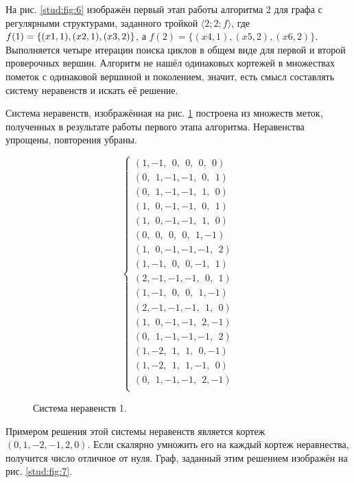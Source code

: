 \documentclass[14pt]{mmcs_article}
\begin{document}
На рис. \ref{stud:fig:6} изображён первый этап работы алгоритма 2 для графа с регулярными структурами, заданного тройкой $ \langle 2; 2; f\rangle $, где $ f(1) = \{ (x1, 1),\\ (x2, 1), (x3, 2) \} $, а $f(2) = \{ (x4, 1), (x5, 2), (x6, 2) \}$. Выполняется четыре итерации поиска циклов в общем виде для первой и второй проверочных вершин. Алгоритм не нашёл одинаковых кортежей в множествах пометок с одинаковой вершиной и поколением, значит, есть смысл составлять систему неравенств и искать её решение.

Система неравенств, изображённая на рис. \ref{stud:eqs:1} построена из множеств меток, полученных в результате работы первого этапа алгоритма. Неравенства упрощены, повторения убраны.

\begin{figure}[H]
  \centering
  \[
    \left\{
      \begin{array}{ll}
        (1,-1,\ \ 0,\ \ 0,\ \ 0,\ \ 0)\\
        (0,\ \ 1,-1,-1,\ \ 0,\ \ 1)\\
        (0,\ \ 1,-1,-1,\ \ 1,\ \ 0)\\
        (1,\ \ 0,-1,-1,\ \ 0,\ \ 1)\\
        (1,\ \ 0,-1,-1,\ \ 1,\ \ 0)\\
        (0,\ \ 0,\ \ 0,\ \ 0,\ \ 1,-1)\\
        (1,\ \ 0,-1,-1,-1,\ \ 2)\\
        (1,-1,\ \ 0,\ \ 0,-1,\ \ 1)\\
        (2,-1,-1,-1,\ \ 0,\ \ 1)\\
        (1,-1,\ \ 0,\ \ 0,\ \ 1,-1)\\
        (2,-1,-1,-1,\ \ 1,\ \ 0)\\
        (1,\ \ 0,-1,-1,\ \ 2,-1)\\
        (0,\ \ 1,-1,-1,-1,\ \ 2)\\
        (1,-2,\ \ 1,\ \ 1,\ \ 0,-1)\\
        (1,-2,\ \ 1,\ \ 1,-1,\ \ 0)\\
        (0,\ \ 1,-1,-1,\ \ 2,-1)\\
      \end{array}
    \right.
  \]
  \caption{ Система неравенств 1. }
  \label{stud:eqs:1}
\end{figure}

Примером решения этой системы неравенств является кортеж\\ $(0, 1, -2, -1, 2, 0)$. Если скалярно умножить его на каждый кортеж неравнества, получится число отличное от нуля. Граф, заданный этим решением изображён на рис. \ref{stud:fig:7}.
\end{document}
